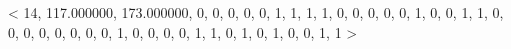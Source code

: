< 14, 117.000000, 173.000000, 0, 0, 0, 0, 0, 1, 1, 1, 1, 0, 0, 0, 0, 0, 1, 0, 0, 1, 1, 0, 0, 0, 0, 0, 0, 0, 0, 1, 0, 0, 0, 0, 1, 1, 0, 1, 0, 1, 0, 0, 1, 1 > 


